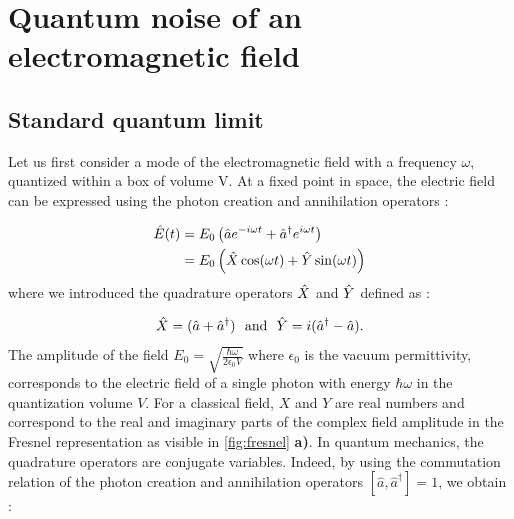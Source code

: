 \section{Quantum noise of an electromagnetic field}
\label{sec:intro_cv}
\subsection{Standard quantum limit}
Let us first consider a mode of the electromagnetic field with a frequency $\omega$, quantized within a box of volume V. At a fixed point in space, the electric field can be expressed using the photon creation and annihilation operators :

\begin{equation}
    \label{eq:field}
    \begin{aligned}
    \hat{E}(t) &= E_0\left( \hat{a} e^{-i\omega t} + \hat{a}^{\dagger} e^{i\omega t} \right) \\
    &= E_0\left(\hat{X}\cos (\omega t) + \hat{Y}\sin(\omega t)\right)
    \end{aligned}
\end{equation}
where we introduced the quadrature operators $\hat{X}$ and $\hat{Y}$ defined as :

\begin{equation}
    \label{eq:quad}
        \hat{X} = (\hat{a} + \hat{a}^{\dagger})  \ \ \mathrm{and}  \ \
        \hat{Y} = i(\hat{a}^{\dagger} - \hat{a}).
\end{equation}
The amplitude of the field $E_0=\sqrt{\frac{\hbar \omega}{2\epsilon_0 V}}$ where $\epsilon_0$ is the vacuum permittivity, corresponds to the electric field of a single photon with energy $\hbar \omega$ in the quantization volume $V$. 
For a classical field, $X$ and $Y$ are real numbers and correspond to the real and imaginary parts of the complex field amplitude in the Fresnel representation as visible in \autoref{fig:fresnel} \textbf{a)}. In quantum mechanics,
the quadrature operators are conjugate variables. Indeed, by using the commutation relation of the photon creation and annihilation operators $[\hat{a},\hat{a}^{\dagger}]=1$, we obtain :

